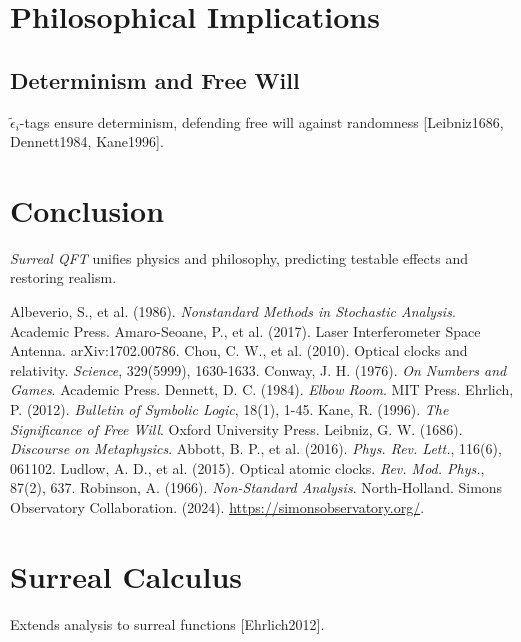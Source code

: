 \documentclass{article}
\begin{document}
\section{Philosophical Implications}
\subsection{Determinism and Free Will}
\(\tilde{\epsilon}_i\)-tags ensure determinism, defending free will against randomness [Leibniz1686, Dennett1984, Kane1996].

\section{Conclusion}
\textit{Surreal QFT} unifies physics and philosophy, predicting testable effects and restoring realism.

\begin{thebibliography}{9}
 Albeverio, S., et al. (1986). \emph{Nonstandard Methods in Stochastic Analysis}. Academic Press.
 Amaro-Seoane, P., et al. (2017). Laser Interferometer Space Antenna. arXiv:1702.00786.
 Chou, C. W., et al. (2010). Optical clocks and relativity. \emph{Science}, 329(5999), 1630-1633.
 Conway, J. H. (1976). \emph{On Numbers and Games}. Academic Press.
 Dennett, D. C. (1984). \emph{Elbow Room}. MIT Press.
 Ehrlich, P. (2012). \emph{Bulletin of Symbolic Logic}, 18(1), 1-45.
 Kane, R. (1996). \emph{The Significance of Free Will}. Oxford University Press.
 Leibniz, G. W. (1686). \emph{Discourse on Metaphysics}.
 Abbott, B. P., et al. (2016). \emph{Phys. Rev. Lett.}, 116(6), 061102.
 Ludlow, A. D., et al. (2015). Optical atomic clocks. \emph{Rev. Mod. Phys.}, 87(2), 637.
 Robinson, A. (1966). \emph{Non-Standard Analysis}. North-Holland.
 Simons Observatory Collaboration. (2024). \url{https://simonsobservatory.org/}.
\end{thebibliography}

\appendix
\section{Surreal Calculus}
Extends analysis to surreal functions [Ehrlich2012].
\end{document}
